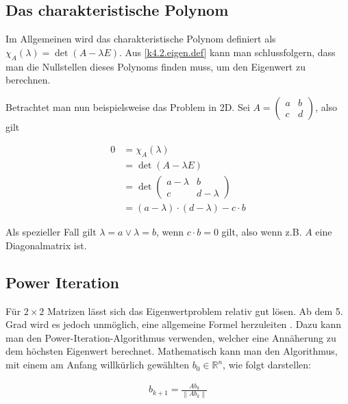 \documentclass[]{dsadokumentation}
\begin{document}
\subsection{Das charakteristische Polynom}

Im Allgemeinen wird das charakteristische Polynom definiert als $\chi_A (\lambda) = \det(A - \lambda E)$. Aus \cref{k4.2.eigen.def} kann man schlussfolgern, dass man die Nullstellen dieses Polynoms finden muss, um den Eigenwert zu berechnen. 

Betrachtet man nun beispielsweise das Problem in 2D. Sei $A = \begin{pmatrix}
  a & b \\
  c & d
\end{pmatrix}$, also gilt

\begin{displaymath}
  \begin{aligned}
    0  
    &= \chi_A (\lambda) \\
    &= \det(A - \lambda E) \\
    &= \det \begin{pmatrix}
      a - \lambda & b \\
      c & d-\lambda
    \end{pmatrix} \\
    &= (a - \lambda) \cdot (d - \lambda) - c \cdot b
  \end{aligned}
\end{displaymath}

Als spezieller Fall gilt $\lambda = a \vee \lambda = b$, wenn $c \cdot b = 0$ gilt, also wenn z.B. $A$ eine Diagonalmatrix ist.


\subsection{Power Iteration}\label{k4.2.eigen.powerit}

Für $2 \times 2$ Matrizen lässt sich das Eigenwertproblem relativ gut lösen. Ab dem 5. Grad wird es jedoch unmöglich, eine allgemeine Formel herzuleiten \parencite{k4.2.ramond}. %
Dazu kann man den Power-Iteration-Algorithmus verwenden, welcher eine Annäherung zu dem höchsten Eigenwert berechnet. Mathematisch kann man den Algorithmus, mit einem am Anfang willkürlich gewählten $b_0 \in \mathbb{R}^n$, wie folgt darstellen: 

\begin{displaymath}
  \begin{aligned}
    b_{k+1} = \frac{Ab_k}{\left\lVert Ab_k \right\rVert }
  \end{aligned}
\end{displaymath}
\end{document}
